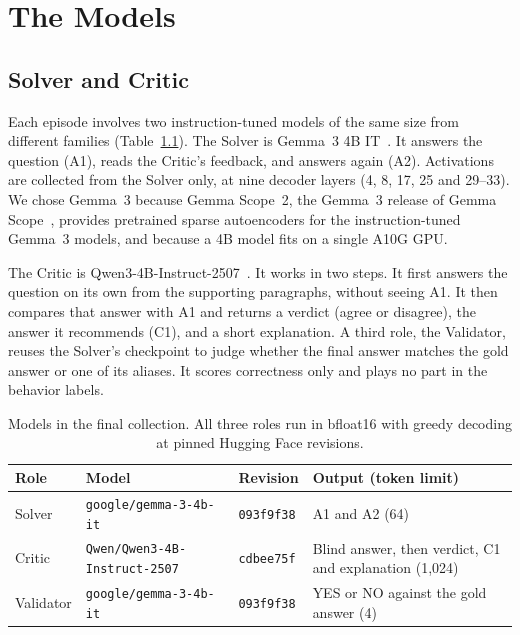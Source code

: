 \chapter{The Models}

\section{Solver and Critic}
\label{sec:solver-critic}

Each episode involves two instruction-tuned models of the same size from
different families (Table~\ref{tab:model-roles}). The Solver is Gemma~3 4B
IT~\cite{gemmateam2025gemma3}. It answers the question (A1), reads the
Critic's feedback, and answers again (A2). Activations are collected from the
Solver only, at nine decoder layers (4, 8, 17, 25 and 29--33). We chose
Gemma~3 because Gemma Scope~2, the Gemma~3 release of Gemma
Scope~\cite{lieberum2024gemmascope}, provides pretrained sparse autoencoders
for the instruction-tuned Gemma~3 models, and because a 4B model fits on a
single A10G GPU.

The Critic is Qwen3-4B-Instruct-2507~\cite{yang2025qwen3}. It works in two
steps. It first answers the question on its own from the supporting
paragraphs, without seeing A1. It then compares that answer with A1 and
returns a verdict (agree or disagree), the answer it recommends (C1), and a
short explanation. A third role, the Validator, reuses the Solver's checkpoint
to judge whether the final answer matches the gold answer or one of its
aliases. It scores correctness only and plays no part in the behavior labels.

\begin{table}[htbp]
    \centering
    \caption{Models in the final collection. All three roles run in bfloat16
    with greedy decoding at pinned Hugging Face revisions.}
    \label{tab:model-roles}
    \begin{tabular}{lllp{4.6cm}}
        \toprule
        Role & Model & Revision & Output (token limit) \\
        \midrule
        Solver    & \texttt{google/gemma-3-4b-it}        & \texttt{093f9f38} & \raggedright A1 and A2 (64) \tabularnewline
        Critic    & \texttt{Qwen/Qwen3-4B-Instruct-2507} & \texttt{cdbee75f} & \raggedright Blind answer, then verdict, C1 and explanation (1,024) \tabularnewline
        Validator & \texttt{google/gemma-3-4b-it}        & \texttt{093f9f38} & \raggedright YES or NO against the gold answer (4) \tabularnewline
        \bottomrule
    \end{tabular}
\end{table}

